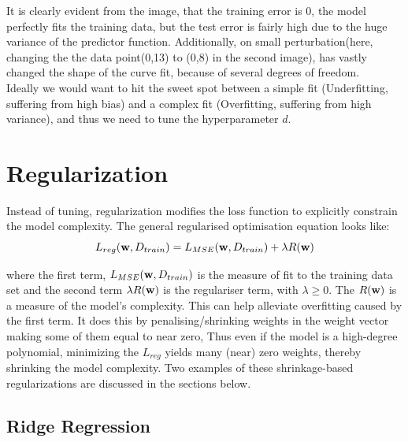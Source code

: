 It is clearly evident from the image, that the training error is 0, the model perfectly fits the training data, but the test error is fairly high due to the huge variance of the predictor function. Additionally, on small perturbation(here, changing the the data point(0,13) to (0,8) in the second image), has vastly changed the shape of the curve fit, because of several degrees of freedom. \\

Ideally we would want to hit the sweet spot between a simple fit (Underfitting, suffering from high bias) and a complex fit (Overfitting, suffering from high variance), and thus we need to tune the hyperparameter $d$.

\section{Regularization}
Instead of tuning, regularization modifies the loss function to explicitly constrain the model complexity. The general regularised optimisation equation looks like:
$$
  L_{reg}(\mathbf{w}, D_{train}) = L_{MSE}(\mathbf{w}, D_{train}) + \lambda R(\mathbf{w})
$$

where the first term, $L_{MSE}(\mathbf{w}, D_{train})$ is the measure of fit to the training data set and the second term $\lambda R(\mathbf{w})$ is the regulariser term, with $\lambda \geq 0$. The $R(\mathbf{w})$ is a measure of the model's complexity. This can help alleviate overfitting caused by the first term. It does this by penalising/shrinking weights in the weight vector making some of them equal to near zero, Thus even if the model is a high-degree polynomial, minimizing the $L_{reg}$ yields many (near) zero weights, thereby shrinking the model complexity. Two examples of these shrinkage-based regularizations are discussed in the sections below.\\


\subsection{Ridge Regression}

